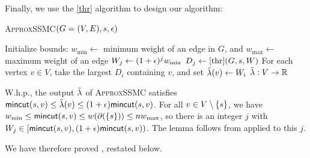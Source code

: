 Finally, we use the \ref{thr} algorithm to design our \ssc algorithm:

\begin{algorithm}
\caption{\textsc{ApproxSSMC}$(G=(V,E),s,\epsilon)$}
\begin{algorithmic}[1]
 \State Initialize bounds: $ w_{\min} \gets$ minimum weight of an edge in $G$, and $ w_{\max}\gets$ maximum weight of an edge %
 \State $ W_j\gets (1+\epsilon)^j w_{\min}$
 \State $D_j\gets \ref{thr}(G,s, W)$
\EndFor
\State For each vertex $v\in V$, take the largest $D_i$ containing $v$, and set $\tilde{\lambda}(v)\gets  W_i$
\State\Return $\tilde{\lambda}:V\to \mathbb R$
\end{algorithmic}
\end{algorithm}

\BL
W.h.p., the output $\tilde{\lambda}$ of \textsc{ApproxSSMC} satisfies\linebreak $\textsf{\textup{mincut}}(s,v) \le \tilde{\lambda}(v) \le (1+\epsilon)\textsf{\textup{mincut}}(s,v)$.
\EL
\BP
For all $v\in V\setminus\{s\}$, we have $w_{\min}\le\textsf{\textup{mincut}}(s,v)\le w(\partial(\{s\}))\le nw_{\max}$, so there is an integer $j$ with\linebreak $ W_j\in[\textsf{\textup{mincut}}(s,v),(1+\epsilon)\textsf{\textup{mincut}}(s,v))$. The lemma follows from  applied to this $j$.
\EP

We have therefore proved , restated below.
\SSMC*


